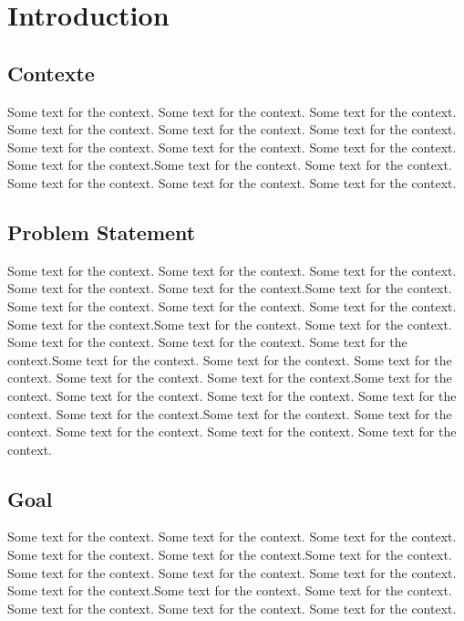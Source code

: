 \chapter{Introduction}
\label{chap:introduction}

\section{Contexte}

Some text for the context. Some text for the context. Some text for the context. Some text for the context. Some text for the context. Some text for the context. Some text for the context. Some text for the context. Some text for the context. Some text for the context.Some text for the context. Some text for the context. Some text for the context. Some text for the context. Some text for the context.

\medskip


\section{Problem Statement}

Some text for the context. Some text for the context. Some text for the context. Some text for the context. Some text for the context.Some text for the context. Some text for the context. Some text for the context. Some text for the context. Some text for the context.Some text for the context. Some text for the context. Some text for the context. Some text for the context. Some text for the context.Some text for the context. Some text for the context. Some text for the context. Some text for the context. Some text for the context.Some text for the context. Some text for the context. Some text for the context. Some text for the context. Some text for the context.Some text for the context. Some text for the context. Some text for the context. Some text for the context. Some text for the context.


\section{Goal}

Some text for the context. Some text for the context. Some text for the context. Some text for the context. Some text for the context.Some text for the context. Some text for the context. Some text for the context. Some text for the context. Some text for the context.Some text for the context. Some text for the context. Some text for the context. Some text for the context. Some text for the context.





